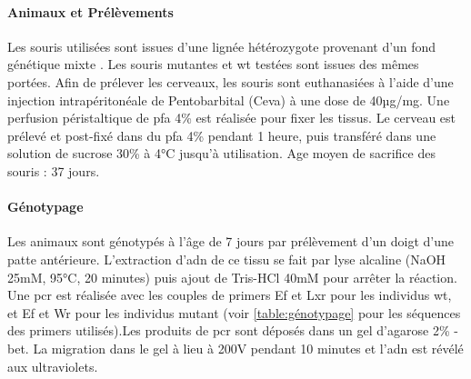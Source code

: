 \paragraph{Animaux et Prélèvements}
\label{par:AnimEtPrelev}
	Les souris utilisées sont issues d'une lignée hétérozygote provenant d'un fond génétique mixte \cite{Messeant2015, Messeant2017}. Les souris mutantes \mcrd et \gls{wt} testées sont issues des mêmes portées. Afin de prélever les cerveaux, les souris sont  euthanasiées à l'aide d'une injection intrapéritonéale de Pentobarbital (Ceva\textregistered) à une dose de 40µg/mg. Une perfusion péristaltique de \gls{pfa} 4\% est réalisée pour fixer les tissus. Le cerveau est prélevé et post-fixé dans du \gls{pfa} 4\% pendant 1 heure, puis transféré dans une solution de sucrose 30\% à 4°C jusqu'à utilisation. Age moyen de sacrifice des souris : 37 jours.
	
\paragraph{Génotypage}
\label{par:genotypage}
	Les animaux sont génotypés à l'âge de 7 jours par prélèvement d'un doigt d'une patte antérieure. L'extraction d'\acrshort{adn} de ce tissu se fait par lyse alcaline (NaOH 25mM, 95°C, 20 minutes) puis ajout de Tris-HCl 40mM pour arrêter la réaction. Une \acrshort{pcr} est réalisée avec les couples de primers Ef et Lxr  pour les individus \gls{wt}, et Ef et Wr pour les individus mutant (voir \cref{table:génotypage} pour les séquences des primers utilisés).Les produits de \acrshort{pcr} sont déposés dans un gel d'agarose 2\% - \acrshort{bet}. La migration dans le gel à lieu à 200V pendant 10 minutes et l'\acrshort{adn} est révélé aux ultraviolets.
	
	\begin{table}[h]
	\end{table}
\FloatBarrier
	
